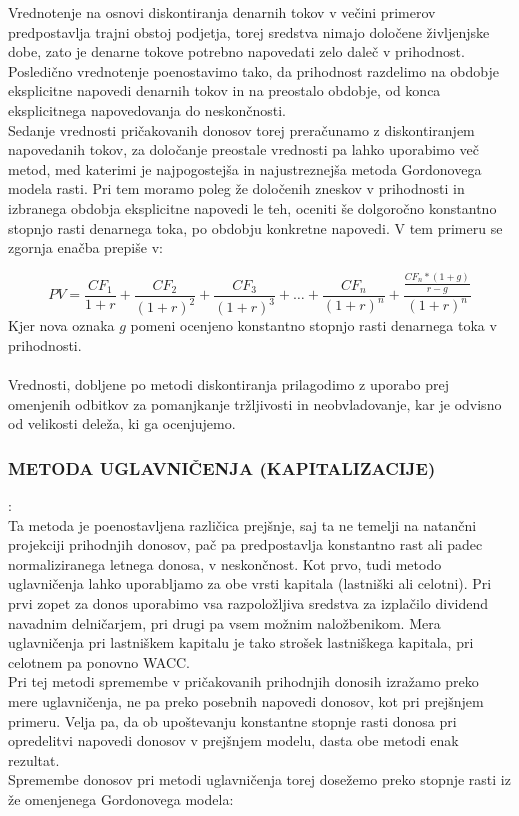 \documentclass[12pt,a4paper]{amsart}
\theoremstyle{definition} %
\theoremstyle{plain} %
\begin{document}
Vrednotenje na osnovi diskontiranja denarnih tokov v večini primerov predpostavlja trajni obstoj podjetja, torej sredstva nimajo določene življenjske dobe, zato je denarne tokove potrebno napovedati zelo daleč v prihodnost. Posledično vrednotenje poenostavimo tako, da prihodnost razdelimo na obdobje eksplicitne napovedi denarnih tokov in na preostalo obdobje, od konca eksplicitnega napovedovanja do neskončnosti. \\
Sedanje vrednosti pričakovanih donosov torej preračunamo z diskontiranjem napovedanih tokov, za določanje preostale vrednosti pa lahko uporabimo več metod, med katerimi je najpogostejša in najustreznejša metoda Gordonovega modela rasti. Pri tem moramo poleg že določenih zneskov v prihodnosti in izbranega obdobja eksplicitne napovedi le teh, oceniti še dolgoročno konstantno stopnjo rasti denarnega toka, po obdobju konkretne napovedi. V tem primeru se zgornja enačba prepiše v:

\begin{equation}
PV=\frac{CF_1}{1+r}+\frac{CF_2}{(1+r)^2}+\frac{CF_3}{(1+r)^3}+\ldots+\frac{CF_n}{(1+r)^n}+\frac{\frac{CF_n*(1+g)}{r-g}}{(1+r)^n}
\end{equation}
Kjer nova oznaka $g$ pomeni ocenjeno konstantno stopnjo rasti denarnega toka v prihodnosti.\\
\\
Vrednosti, dobljene po metodi diskontiranja prilagodimo z uporabo prej omenjenih odbitkov za pomanjkanje tržljivosti in neobvladovanje, kar je odvisno od velikosti deleža, ki ga ocenjujemo.


\subsubsection{METODA UGLAVNIČENJA (KAPITALIZACIJE)}:\\
Ta metoda je poenostavljena različica prejšnje, saj ta ne temelji na natančni projekciji prihodnjih donosov, pač pa predpostavlja konstantno rast ali padec normaliziranega letnega donosa, v neskončnost. Kot prvo, tudi metodo uglavničenja lahko uporabljamo za obe vrsti kapitala (lastniški ali celotni). Pri prvi zopet za donos uporabimo vsa razpoložljiva sredstva za izplačilo dividend navadnim delničarjem, pri drugi pa vsem možnim naložbenikom. Mera uglavničenja pri lastniškem kapitalu je tako strošek lastniškega kapitala, pri celotnem pa ponovno WACC.\\
Pri tej metodi spremembe v pričakovanih prihodnjih donosih izražamo preko mere uglavničenja, ne pa preko posebnih napovedi donosov, kot pri prejšnjem primeru. Velja pa, da ob upoštevanju konstantne stopnje rasti donosa pri opredelitvi napovedi donosov v prejšnjem modelu, dasta obe metodi enak rezultat.\\
Spremembe donosov pri metodi uglavničenja torej dosežemo preko stopnje rasti iz že omenjenega Gordonovega modela:
\end{document}
